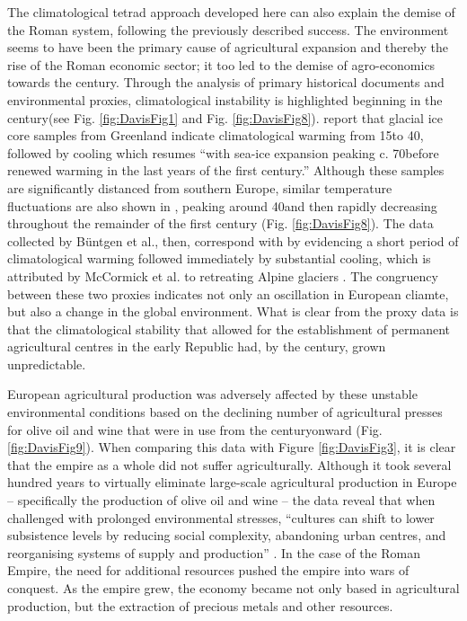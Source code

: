 The climatological tetrad approach developed here can also explain the demise of the Roman system, following the previously described success. 
The environment seems to have been the primary cause of agricultural expansion and thereby the rise of the Roman economic sector; it too led to the demise of agro-economics towards the  century\AD. 
Through the analysis of primary historical documents and environmental proxies, climatological instability is highlighted beginning in the  century\AD (see Fig. \ref{fig:DavisFig1} and Fig. \ref{fig:DavisFig8}). \textcite[175]{McCormick_2012} report that glacial ice core samples from Greenland indicate climatological warming from 15\BC to 40\AD, followed by cooling which resumes “with sea-ice expansion peaking c. 70\AD before renewed warming in the last years of the first century.” 
Although these samples are significantly distanced from southern Europe, similar temperature fluctuations are also shown in \textcite{Büntgen_2011b}, peaking around 40\AD and then rapidly decreasing throughout the remainder of the first century (Fig. \ref{fig:DavisFig8}). The data collected by Büntgen et al., then, correspond with \textcite{McCormick_2012} by evidencing a short period of climatological warming followed immediately by substantial cooling, which is attributed by McCormick et al. to retreating Alpine glaciers \parencites{Büntgen_2011a}{Büntgen_2011b}[175--180]{McCormick_2012}. 
The congruency between these two proxies indicates not only an oscillation in European cliamte, but also a change in the global environment. What is clear from the proxy data is that the climatological stability that allowed for the establishment of permanent agricultural centres in the early Republic had, by the  century\AD, grown unpredictable.



European agricultural production was adversely affected by these unstable environmental conditions based on the declining number of agricultural presses for olive oil and wine that were in use from the  century\AD onward (Fig. \ref{fig:DavisFig9}). When comparing this data with Figure \ref{fig:DavisFig3}, it is clear that the empire as a whole did not suffer agriculturally. 
Although it took several hundred years to virtually eliminate large-scale agricultural production in Europe – specifically the production of olive oil and wine – the data reveal that when challenged with prolonged environmental stresses, “cultures can shift to lower subsistence levels by reducing social complexity, abandoning urban centres, and reorganising systems of supply and production” \parencite[672]{deMenocal_2001}. In the case of the Roman Empire, the need for additional resources pushed the empire into wars of conquest. As the empire grew, the economy became not only based in agricultural production, but the extraction of precious metals and other resources.

